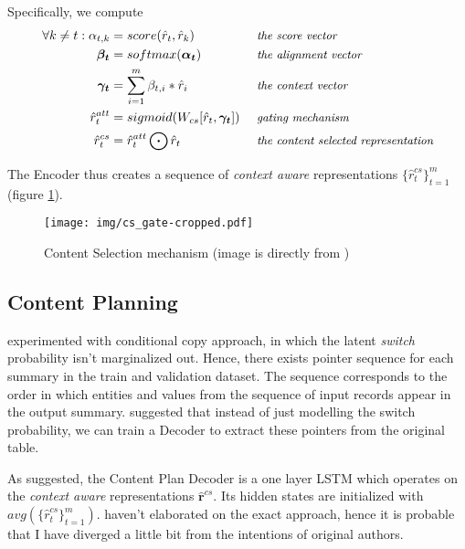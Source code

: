 Specifically, we compute
\begin{align*}
\forall k \neq t : \alpha_{t, k} &= score(\hat{r}_t, \hat{r}_k)                         &&\mbox{ \small \emph{the score vector}}\\
\boldsymbol{\beta_t}             &= softmax(\boldsymbol{\alpha_t})                      &&\mbox{ \small \emph{the alignment vector}}\\
\boldsymbol{\gamma_t}            &= \sum_{i=1}^m{\beta_{t, i} * \hat{r}_i}               &&\mbox{ \small \emph{the context vector}}\\
\hat{r}_t^{att}                  &= sigmoid( W_{cs} [\hat{r}_t, \boldsymbol{\gamma_t}] ) &&\mbox{ \small \emph{gating mechanism}}\\
\hat{r}_t^{cs}                   &= \hat{r}_t^{att} \bigodot \hat{r}_t                  &&\mbox{ \small \emph{the content selected representation}}
\end{align*}

The Encoder thus creates a sequence of \emph{context aware} representations $\{\hat{r}_t^{cs}\}_{t=1}^m$ (figure \ref{content_selection_pudupully}).

\begin{figure}[!h]
    \texttt{[image: img/cs\_gate-cropped.pdf]}
    \caption{Content Selection mechanism (image is directly from \citep{puduppully2019datatotext})} \label{content_selection_pudupully}
\end{figure}

\subsection{Content Planning} \label{content_planning_subsubsection}

\citep{wiseman2017} experimented with conditional copy approach, in which the latent \emph{switch} probability isn't marginalized out. Hence, there exists pointer sequence for each summary in the train and validation dataset. The sequence corresponds to the order in which entities and values from the sequence of input records appear in the output summary. \citep{puduppully2019datatotext} suggested that instead of just modelling the switch probability, we can train a Decoder to extract these pointers from the original table.

As suggested, the Content Plan Decoder is a one layer LSTM which operates on the \emph{context aware} representations $\hat{\mathbf{r}}^{cs}$. Its hidden states are initialized with $avg(\{\hat{r}_t^{cs}\}_{t=1}^m)$. \citep{puduppully2019datatotext} haven't elaborated on the exact approach, hence it is probable that I have diverged a little bit from the intentions of original authors.

